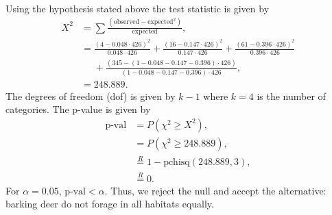 \documentclass[a4paper, 12pt]{../../config/homework}
\begin{document}
\begin{enumerate}
\begin{enumerate}[label=(\alph*)]
\\Using the hypothesis stated above the test statistic is given by
\begin{align*}
X^2 &= \sum{\frac{(\text{observed} - \text{expected}^2)}{\text{expected}}},\\
&= \frac{(4 - 0.048\cdot 426)^2}{0.048\cdot 426} + \frac{(16 - 0.147\cdot 426)^2}{0.147\cdot 426} + \frac{(61 - 0.396\cdot 426)^2}{0.396\cdot 426} \\&\phantom{=}+ \frac{(345 - (1 - 0.048 - 0.147 - 0.396)\cdot426)}{(1 - 0.048 - 0.147 - 0.396)\cdot426},\\
&= 248.889.
\end{align*}
The degrees of freedom (dof) is given by \(k-1\) where \(k=4\) is the number of categories.
The p-value is given by
\begin{align*}
\text{p-val} &= P(\chi^2 \ge X^2),\\
&= P(\chi^2 \ge 248.889),\\
&\overset{R}{=} 1 - \text{pchisq}(248.889, 3),\\
&\overset{R}{=} 0.
\end{align*}
For \(\alpha = 0.05\), \(\text{p-val} < \alpha \). Thus, we reject the null and accept the alternative: barking deer do not forage in all habitats equally.
\end{enumerate}


\end{enumerate}
\end{document}
